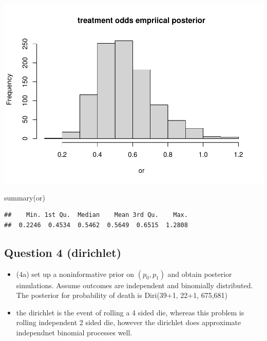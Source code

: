 \documentclass[
]{book}
\newenvironment{Shaded}{\begin{snugshade}}{\end{snugshade}}
\newcommand{\FunctionTok}[1]{\textcolor[rgb]{0.00,0.00,0.00}{#1}}
\newcommand{\NormalTok}[1]{#1}
\providecommand{\tightlist}{%
  \setlength{\itemsep}{0pt}\setlength{\parskip}{0pt}}
\theoremstyle{definition}
\theoremstyle{definition}
\theoremstyle{definition}
\theoremstyle{definition}
\theoremstyle{remark}
\begin{document}
\includegraphics{_main_files/figure-latex/unnamed-chunk-35-1.pdf}

\begin{Shaded}
\begin{Highlighting}[]
  \FunctionTok{summary}\NormalTok{(or)}
\end{Highlighting}
\end{Shaded}

\begin{verbatim}
##    Min. 1st Qu.  Median    Mean 3rd Qu.    Max. 
##  0.2246  0.4534  0.5462  0.5649  0.6515  1.2808
\end{verbatim}

\hypertarget{question-4-dirichlet}{%
\subsection*{Question 4 (dirichlet)}\label{question-4-dirichlet}}

\begin{itemize}
\tightlist
\item
  (4a) set up a noninformative prior on \((p_0,p_1)\) and obtain posterior simulations. Assume outcomes are independent and binomially distributed. The posterior for probability of death is Diri(39+1, 22+1, 675,681)
\item
  the dirichlet is the event of rolling a 4 sided die, whereas this problem is rolling independent 2 sided die, however the dirichlet does approximate independnet binomial processes well.
\end{itemize}
\end{document}
